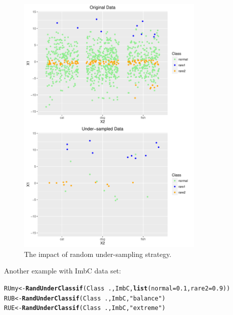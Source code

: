 \documentclass[10pt,a4paper]{article}\usepackage[]{graphicx}\usepackage[]{color}
\makeatletter
\newcommand{\hlnum}[1]{\textcolor[rgb]{0.686,0.059,0.569}{#1}}%
\newcommand{\hlstr}[1]{\textcolor[rgb]{0.192,0.494,0.8}{#1}}%
\newcommand{\hlopt}[1]{\textcolor[rgb]{0,0,0}{#1}}%
\newcommand{\hlstd}[1]{\textcolor[rgb]{0.345,0.345,0.345}{#1}}%
\newcommand{\hlkwb}[1]{\textcolor[rgb]{0.69,0.353,0.396}{#1}}%
\newcommand{\hlkwc}[1]{\textcolor[rgb]{0.333,0.667,0.333}{#1}}%
\newcommand{\hlkwd}[1]{\textcolor[rgb]{0.737,0.353,0.396}{\textbf{#1}}}%
\newenvironment{kframe}{%
 \def\at@end@of@kframe{}%
 \ifinner\ifhmode%
  \def\at@end@of@kframe{\end{minipage}}%
  \begin{minipage}{\columnwidth}%
 \fi\fi%
 \def\FrameCommand##1{\hskip\@totalleftmargin \hskip-\fboxsep
 \colorbox{shadecolor}{##1}\hskip-\fboxsep
     \hskip-\linewidth \hskip-\@totalleftmargin \hskip\columnwidth}%
 \MakeFramed {\advance\hsize-\width
   \@totalleftmargin\z@ \linewidth\hsize
   \@setminipage}}%
 {\par\unskip\endMakeFramed%
 \at@end@of@kframe}
\newenvironment{knitrout}{}{} %
\makeatother
\begin{document}
\begin{knitrout}\footnotesize
{}\color{fgcolor}\begin{figure}

{\centering \includegraphics[width=0.8\textwidth]{figures/UBL-Iris_RU1-1} 

}

\caption[The impact of random under-sampling strategy]{The impact of random under-sampling strategy.}\label{fig:Iris_RU1}
\end{figure}


\end{knitrout}

Another example with ImbC data set:

\begin{knitrout}\footnotesize
{}\color{fgcolor}\begin{kframe}
\begin{alltt}
  \hlstd{RUmy} \hlkwb{<-} \hlkwd{RandUnderClassif}\hlstd{(Class}\hlopt{~}\hlstd{., ImbC,} \hlkwd{list}\hlstd{(}\hlkwc{normal}\hlstd{=}\hlnum{0.1}\hlstd{,} \hlkwc{rare2}\hlstd{=}\hlnum{0.9}\hlstd{))}
  \hlstd{RUB} \hlkwb{<-} \hlkwd{RandUnderClassif}\hlstd{(Class}\hlopt{~}\hlstd{., ImbC,} \hlstr{"balance"}\hlstd{)}
  \hlstd{RUE} \hlkwb{<-} \hlkwd{RandUnderClassif}\hlstd{(Class}\hlopt{~}\hlstd{., ImbC,} \hlstr{"extreme"}\hlstd{)}
\end{alltt}
\end{kframe}
\end{knitrout}
\end{document}
